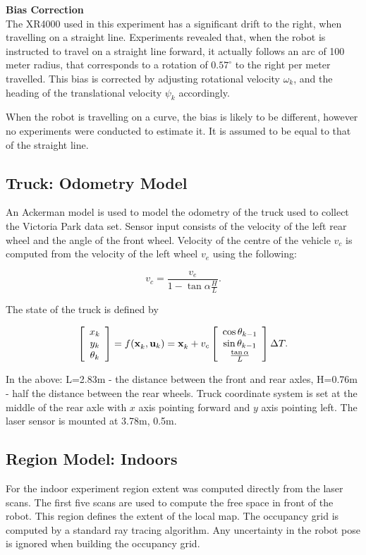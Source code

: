 {\bf Bias Correction}\\ The XR4000 used in this experiment has a
significant drift to the right, when travelling on a straight
line. Experiments revealed that, when the robot is instructed to travel
on a straight line forward, it actually follows an arc of 100 meter
radius, that corresponds to a rotation of $0.57^\circ$ to the right per
meter travelled. This bias is corrected by adjusting rotational velocity
$\omega_k$, and the heading of the translational velocity $\psi_k$
accordingly.

When the robot is travelling on a curve, the bias is likely to be
different, however no experiments were conducted to estimate it. It is
assumed to be equal to that of the straight line.


\subsection{Truck: Odometry Model}

An Ackerman model is used to model the odometry of the truck used to
collect the Victoria Park data set. Sensor input consists of the
velocity of the left rear wheel and the angle of the front
wheel. Velocity of the centre of the vehicle $v_c$ is computed from the
velocity of the left wheel $v_e$ using the following:

$$
v_c = \frac{v_e}{1 - \tan \alpha \frac{H}{L}}.
$$

The state of the truck is defined by

$$
\Vector{x_k\\y_k\\\theta_k} = f(\x{k}{}{},\U{k}) = 
\x{k}{}{} + v_c \Vector{\cos \theta_{k-1} \\ \sin
  \theta_{k-1} \\ \frac{\tan \alpha}{L}} \Delta T.
$$

In the above: L=2.83m - the distance between the front and rear axles,
H=0.76m - half the distance between the rear wheels. Truck coordinate
system is set at the middle of the rear axle with $x$ axis pointing
forward and $y$ axis pointing left. The laser sensor is mounted at 3.78m,
0.5m.

\subsection{Region Model: Indoors}

For the indoor experiment region extent was computed directly from the
laser scans. The first five scans are used to compute the free space in
front of the robot. This region defines the extent of the local map.
The occupancy grid is computed by a standard ray tracing algorithm. Any
uncertainty in the robot pose is ignored when building the occupancy
grid.

